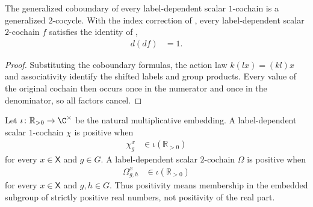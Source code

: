 \begin{lemma}
    \label{thm:mpug_generalized_coboundary_squared}
    \leanok
    The generalized coboundary of every label-dependent scalar $1$-cochain
    is a generalized $2$-cocycle. With the index correction of
    \cite{gap:fbc25_two_cochain_coboundary_index_typo}, every label-dependent
    scalar $2$-cochain $f$ satisfies the identity of
    \cite[line~5922]{FrancoRubio2025MPUGauging},
    \begin{align}
        d(df) & =1.
        \label{eq:mpug_generalized_coboundary_squared}
    \end{align}
\end{lemma}

\begin{proof}\leanok
    Substituting the coboundary formulas, the action law
    $k(lx)=(kl)x$ and associativity identify the shifted labels and
    group products. Every value of the original cochain then occurs once in
    the numerator and once in the denominator, so all factors cancel.
\end{proof}

\begin{definition}
    \label{def:mpug_positive_generalized_cochains}
    \leanok
    Let $\iota\colon\mathbb R_{>0}\to\C^\times$ be the natural
    multiplicative embedding. A label-dependent scalar $1$-cochain $\chi$ is
    positive when
    \begin{align}
        \chi^x_g & \in\iota(\mathbb R_{>0})
        \label{eq:mpug_positive_one_cochain}
    \end{align}
    for every $x\in\mathsf X$ and $g\in G$. A label-dependent scalar
    $2$-cochain $\Omega$ is positive when
    \begin{align}
        \Omega^x_{g,h} & \in\iota(\mathbb R_{>0})
        \label{eq:mpug_positive_two_cochain}
    \end{align}
    for every $x\in\mathsf X$ and $g,h\in G$. Thus positivity means
    membership in the embedded subgroup of strictly positive real numbers,
    not positivity of the real part.
\end{definition}

